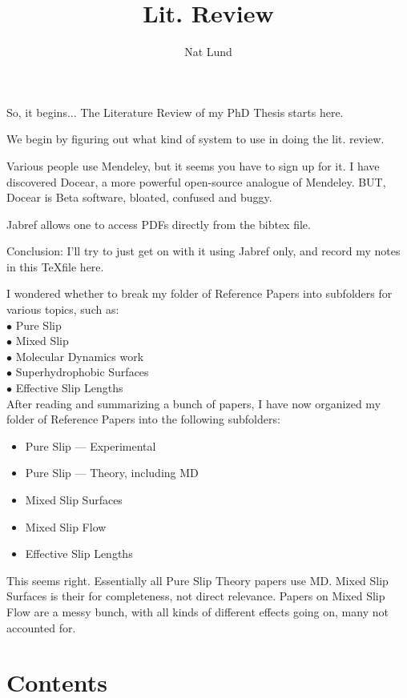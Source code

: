 \documentclass[twocolumn]{article}
\title{Lit. Review}
\author{Nat Lund}
\begin{document}
\maketitle

So, it begins... The Literature Review of my PhD Thesis starts here.

We begin by figuring out what kind of system to use in doing the lit. review.

Various people use Mendeley, but it seems you have to sign up for it.  I have discovered Docear, a more powerful open-source analogue of Mendeley.  BUT, Docear is Beta software, bloated, confused and buggy.

Jabref allows one to access PDFs directly from the bibtex file.

Conclusion:  I'll try to just get on with it using Jabref only, and record my notes in this \TeX file here.

I wondered whether to break my folder of Reference Papers into subfolders for various topics, such as:\\
$\bullet$ Pure Slip\\
$\bullet$ Mixed Slip\\
$\bullet$ Molecular Dynamics work\\
$\bullet$ Superhydrophobic Surfaces\\
$\bullet$ Effective Slip Lengths\\


After reading and summarizing a bunch of papers, I have now organized my folder of Reference Papers into the following subfolders:
\begin{itemize}
    \item Pure Slip --- Experimental
    \item Pure Slip --- Theory, including MD
    \item Mixed Slip Surfaces
    \item Mixed Slip Flow
    \item Effective Slip Lengths
\end{itemize}

This seems right. Essentially all Pure Slip Theory papers use MD. Mixed Slip Surfaces is their for completeness, not direct relevance.  Papers on Mixed Slip Flow are a messy bunch, with all kinds of different effects going on, many not accounted for.

\section*{Contents}
\end{document}
